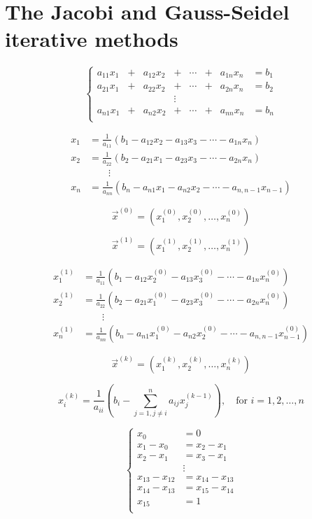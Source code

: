 \documentclass[notitlepage]{report}
\begin{document}
\section{The Jacobi and Gauss-Seidel iterative methods}
\label{sec:gauss-seidel}
$$
\left\{
\begin{array}{cccccccc}
a_{11}x_1 & + &  a_{12}x_2  &+      & \cdots & + & a_{1n}x_n &= b_1\\
a_{21}x_1 & + &  a_{22}x_2  &+      & \cdots & + & a_{2n}x_n &= b_2\\
          &   &             &\vdots &        &   &           &     \\
a_{n1}x_1 & + &  a_{n2}x_2  &+      & \cdots & + & a_{nn}x_n &= b_n\\
\end{array}
\right.
$$

\begin{align*}
x_1 &= \frac{1}{a_{11}}(b_1 - a_{12}x_2 - a_{13}x_3 - \cdots - a_{1n}x_n)\\
x_2 &= \frac{1}{a_{22}}(b_2 - a_{21}x_1 - a_{23}x_3 - \cdots - a_{2n}x_n)\\
    & \qquad \vdots \\
x_n &= \frac{1}{a_{nn}}(b_n - a_{n1}x_1 - a_{n2}x_2 - \cdots - a_{n,n-1}x_{n-1})
\end{align*}

$$\vec{x}^{(0)}=\left(x_1^{(0)}, x_2^{(0)}, \dots, x_n^{(0)}\right)$$

$$\vec{x}^{(1)}=\left(x_1^{(1)}, x_2^{(1)}, \dots, x_n^{(1)}\right)$$

\begin{align*}
x_1^{(1)} &= \frac{1}{a_{11}}(b_1 - a_{12}x_2^{(0)} - a_{13}x_3^{(0)} - \cdots - a_{1n}x_n^{(0)})\\
x_2^{(1)} &= \frac{1}{a_{22}}(b_2 - a_{21}x_1^{(0)} - a_{23}x_3^{(0)} - \cdots - a_{2n}x_n^{(0)})\\
    & \qquad \vdots \\                                                                          
x_n^{(1)} &= \frac{1}{a_{nn}}(b_n - a_{n1}x_1^{(0)} - a_{n2}x_2^{(0)} - \cdots - a_{n,n-1}x_{n-1}^{(0)})
\end{align*}

$$\vec{x}^{(k)}=\left(x_1^{(k)}, x_2^{(k)}, \dots, x_n^{(k)}\right)$$

$$
x_i^{(k)} = \frac{1}{a_{ii}} \left(b_i - \sum\limits_{j=1,j\neq i}^n a_{ij}x_j^{(k-1)} \right), \quad \text{for } i=1,2,\dots,n
$$

\begin{equation}
\label{eq:1d:smooth}
\left\{
\begin{array}{rl}
 x_0 &= 0 \\
x_1-x_0 &= x_2-x_1 \\
x_2-x_1 &= x_3-x_1 \\
     &  \vdots \\
x_{13}-x_{12}     &= x_{14}-x_{13} \\
x_{14}-x_{13}     &= x_{15}-x_{14} \\
x_{15} &= 1 \\
\end{array}
\right.
\end{equation}
\end{document}
